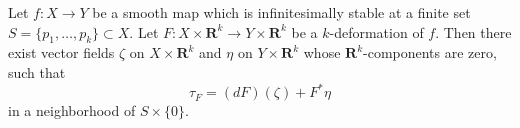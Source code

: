 Let $f \colon X \to Y$ be a smooth map which is infinitesimally stable at a finite set
$S = \{p_1, \ldots, p_k\} \subset X$.
Let $F \colon X \times \mathbf{R}^k \to Y \times \mathbf{R}^k$ be a $k$-deformation of $f$.
Then there exist vector fields $\zeta$ on $X \times \mathbf{R}^k$ and $\eta$ on $Y \times \mathbf{R}^k$
whose $\mathbf{R}^k$-components are zero, such that
$$\tau_F = (dF)(\zeta) + F^*\eta$$
in a neighborhood of $S \times \{0\}$.
